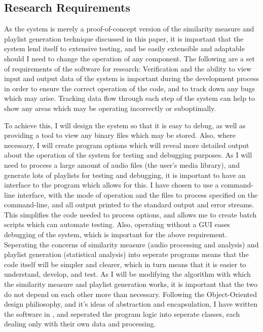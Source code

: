 \subsection{Research Requirements}
As the system is merely a proof-of-concept version of the similarity measure and playlist generation technique discussed in this paper, it is important that the system lend itself to extensive testing, and be easily extensible and adaptable should I need to change the operation of any component. The following are a set of requirements of the software for research: 
Verification and the ability to view input and output data of the system is important during the development process in order to ensure the correct operation of the code, and to track down any bugs which may arise. Tracking data flow through each step of the system can help to show any areas which may be operating incorrectly or suboptimally.

To achieve this, I will design the system so that it is easy to debug, as well as providing a tool to view any binary files which may be stored. Also, where necessary, I will create program options which will reveal more detailed output about the operation of the system for testing and debugging purposes.
As I will need to process a large amount of audio files (the user's media library), and generate lots of playlists for testing and debugging, it is important to have an interface to the program which allows for this. I have chosen to use a command-line interface, with the mode of operation and the files to process specified on the command-line, and all output printed to the standard output and error streams. This simplifies the code needed to process options, and allows me to create batch scripts which can automate testing. Also, operating without a GUI eases debugging of the system, which is important for the above requirement.
Seperating the concerns of similarity measure (audio processing and analysis) and playlist generation (statistical analysis) into seperate programs means that the code itself will be simpler and clearer, which in turn means that it is easier to understand, develop, and test. As I will be modifying the algorithm with which the similarity measure and playlist generation works, it is important that the two do not depend on each other more than necessary. Following the Object-Oriented design philiosophy, and it's ideas of abstraction and encapsulation, I have written the software in , and seperated the program logic into seperate classes, each dealing only with their own data and processing.
